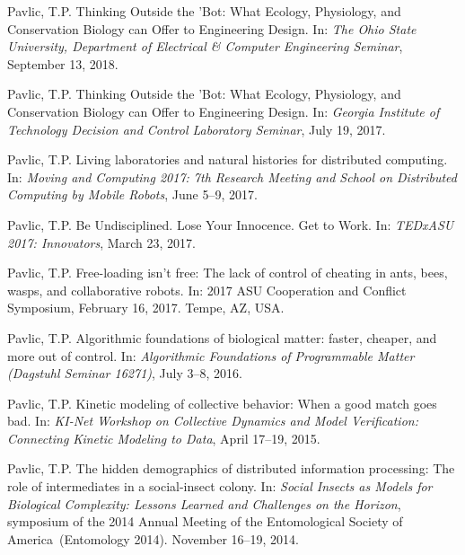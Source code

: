 \documentclass[10pt]{article}
\begin{document}
\begin{bibenum}
    \item Pavlic, T.P. Thinking Outside the 'Bot: What Ecology,
        Physiology, and Conservation Biology can Offer to Engineering
        Design. In: \emph{The Ohio State University, Department of
        Electrical \& Computer Engineering Seminar}, September 13, 2018.

    \item Pavlic, T.P. Thinking Outside the 'Bot: What Ecology,
        Physiology, and Conservation Biology can Offer to Engineering
        Design. In: \emph{Georgia Institute of Technology Decision and
        Control Laboratory Seminar}, July 19, 2017.

    \item Pavlic, T.P. Living laboratories and natural histories for
        distributed computing. In: \emph{Moving and Computing 2017: 7th
        Research Meeting and School on Distributed Computing by
        Mobile Robots}, June 5--9, 2017.

    \item Pavlic, T.P. Be Undisciplined. Lose Your Innocence. Get to
        Work. In: \emph{TEDxASU 2017: Innovators}, March 23, 2017.

    \item Pavlic, T.P. Free-loading isn't free: The lack of
        control of cheating in ants, bees, wasps, and collaborative
        robots. In: 2017 ASU Cooperation and Conflict Symposium,
        February 16, 2017. Tempe, AZ, USA.

    \item Pavlic, T.P. Algorithmic foundations of biological matter:
        faster, cheaper, and more out of control. In: \emph{Algorithmic
        Foundations of Programmable Matter (Dagstuhl Seminar 16271)},
        July 3--8, 2016.

    \item Pavlic, T.P. Kinetic modeling of collective behavior: When a
        good match goes bad. In: \emph{KI-Net Workshop on Collective
        Dynamics and Model Verification: Connecting Kinetic Modeling to
        Data}, April 17--19, 2015.

    \item Pavlic, T.P.
        The hidden demographics of distributed information processing:
        The role of intermediates in a social-insect colony. In:
        \emph{Social Insects as Models for Biological Complexity:
        Lessons Learned and Challenges on the Horizon}, symposium of the
        2014 Annual Meeting of the Entomological Society of
        America~(Entomology 2014). November 16--19, 2014.


\end{bibenum}
\end{document}
